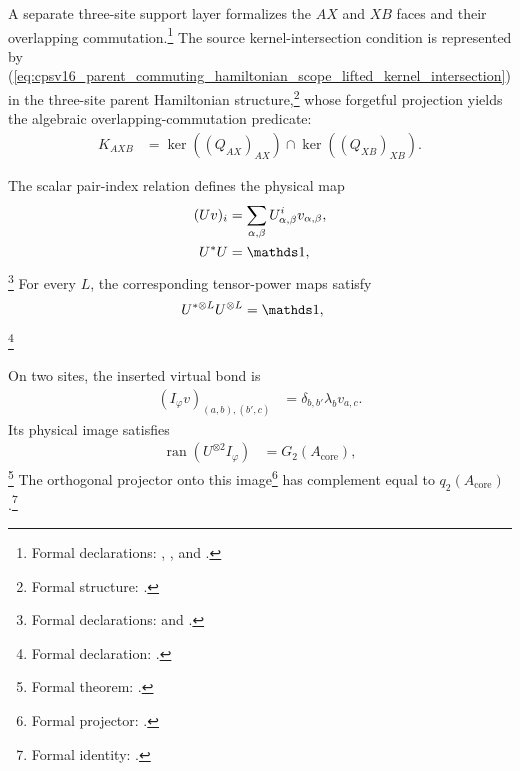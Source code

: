 \documentclass{article}
\begin{document}
A separate three-site support layer formalizes the $AX$ and $XB$ faces and
their overlapping commutation.\footnote{Formal declarations:
, , and
.} The source
kernel-intersection condition is represented by
(\ref{eq:cpsv16_parent_commuting_hamiltonian_scope_lifted_kernel_intersection})
in the three-site parent Hamiltonian structure,\footnote{Formal structure:
.} whose forgetful
projection yields the algebraic overlapping-commutation predicate:
\begin{align}
    K_{AXB}
        &=\ker((Q_{AX})_{AX})\cap\ker((Q_{XB})_{XB}).
    \label{eq:cpsv16_parent_commuting_hamiltonian_scope_lifted_kernel_intersection}
\end{align}

The scalar pair-index relation defines the physical map
\begin{align}
    (Uv)_i
        &=\sum_{\alpha,\beta}U^i_{\alpha,\beta}v_{\alpha,\beta},
    \label{eq:cpsv16_parent_commuting_hamiltonian_scope_physical_map}\\
    U^*U
        &=\Id,
    \label{eq:cpsv16_parent_commuting_hamiltonian_scope_physical_isometry}
\end{align}
\footnote{Formal declarations:
 and
.}
For every $L$, the corresponding tensor-power maps satisfy
\begin{align}
    U^{*\otimes L}U^{\otimes L}
        &=\Id,
    \label{eq:cpsv16_parent_commuting_hamiltonian_scope_tensor_power_isometry}
\end{align}
\footnote{Formal declaration:
.}

On two sites, the inserted virtual bond is
\begin{align}
    (I_\varphi v)_{(a,b),(b',c)}
        &=\delta_{b,b'}\lambda_bv_{a,c}.
    \label{eq:cpsv16_parent_commuting_hamiltonian_scope_virtual_bond_embedding}
\end{align}
Its physical image satisfies
\begin{align}
    \operatorname{ran}(U^{\otimes 2}I_\varphi)
        &=G_2(A_{\mathrm{core}}),
    \label{eq:cpsv16_parent_commuting_hamiltonian_scope_two_site_image}
\end{align}
\footnote{Formal theorem:
.} The
orthogonal projector onto this image\footnote{Formal projector:
.} has
complement equal to $q_2(A_{\mathrm{core}})$.\footnote{Formal identity:
.}
\end{document}
